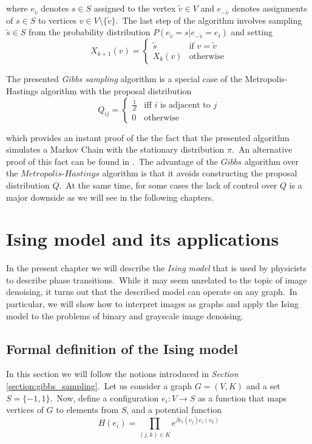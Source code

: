 \documentclass[a4paper, 11pt, onecolumn, openany, titlepage]{report}
\newcommand\numberedchapter[1]{\setlength\topskip{3cm}\chapter{#1}\setlength\topskip{0cm}}
\theoremstyle{default_theorem_style}\newtheorem{theorem}{Theorem}
\theoremstyle{default_theorem_style}\newtheorem{definition}{Definition}
\begin{document}
where $e_{\tilde{v}}$ denotes $s \in S$ assigned to the vertex $\tilde{v} \in V$ and $e_{-\tilde{v}}$
denotes assignments of $s \in S$ to vertices $v \in V \setminus \{\tilde{v}\}$.\ The last step of the algorithm
involves sampling $\tilde{s} \in S$ from the probability distribution $P(e_{\tilde{v}} = s | e_{-\tilde{v}} = e_i)$
and setting
$$
X_{k + 1}(v) =
\begin{cases}
  \tilde{s} &\text{if $v = \tilde{v}$}\\
  X_k(v) &\text{otherwise}
\end{cases}
$$

The presented \textit{Gibbs sampling} algorithm is a special case of the Metropolis-Hastings algorithm with the
proposal distribution
$$
Q_{ij} =
\begin{cases}
  \frac{1}{Z} &\text{iff $i$ is adjacent to $j$}\\
  0 &\text{otherwise}
\end{cases}
$$

which provides an instant proof of the the fact that the presented algorithm simulates a Markov Chain with the
stationary distribution $\pi$.\ An alternative proof of this fact can be found in \cite{mcmc_book}.\ The advantage of
the $Gibbs$ algorithm over the $Metropolis$-$Hastings$ algorithm is that it avoids constructing  the proposal
distribution $Q$.\ At the same time, for some cases the lack of control over $Q$ is a major downside as we will see
in the following chapters.

\numberedchapter{Ising model and its applications}\label{chapter:ising_model}

In the present chapter we will describe the \textit{Ising model} that is used by physicists to describe phase
transitions.\ While it may seem unrelated to the topic of image denoising, it turns out that the described model
can operate on any graph.\ In particular, we will show how to interpret images as graphs and apply the Ising model to
the problems of binary and grayscale image denoising.

\section{Formal definition of the Ising model}

In this section we will follow the notions introduced in \textit{Section} \ref{section:gibbs_sampling}.\ Let us consider
a graph $G = (V, K)$ and a set $S = \{-1, 1\}$.\ Now, define a configuration $e_i : V \to S$ as a function that
maps vertices of $G$ to elements from $S$, and a potential function
$$
H(e_i) = \prod\limits_{(j, k) \in K} e^{\beta e_i(v_j)e_i(v_k)}
$$
\end{document}
